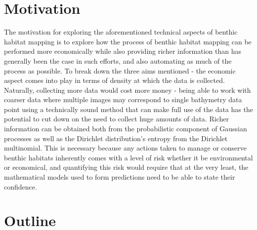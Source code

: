\section{Motivation}
The motivation for exploring the aforementioned technical aspects of benthic habitat mapping is to explore how the process of benthic habitat mapping can be performed more economically while also providing richer information than has generally been the case in such efforts, and also automating as much of the process as possible. To break down the three aims mentioned - the economic aspect comes into play in terms of density at which the data is collected. Naturally, collecting more data would cost more money - being able to work with coarser data where multiple images may correspond to single bathymetry data point using a technically sound method that can make full use of the data has the potential to cut down on the need to collect huge amounts of data. Richer information can be obtained both from the probabilistic component of Gaussian processes as well as the Dirichlet distribution's entropy from the Dirichlet multinomial. This is necessary because any actions taken to manage or conserve benthic habitats inherently comes with a level of risk whether it be environmental or economical, and quantifying this risk would require that at the very least, the mathematical models used to form predictions need to be able to state their confidence.


\section{Outline}

